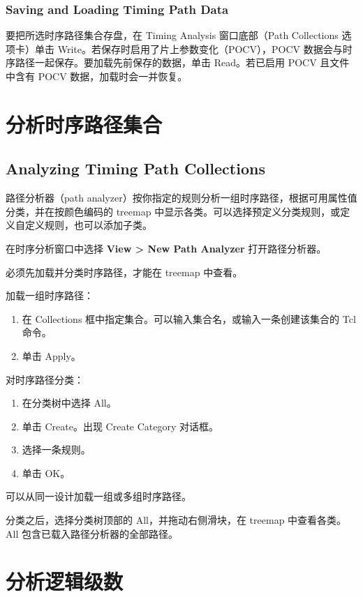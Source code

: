\subsubsection*{Saving and Loading Timing Path Data}

要把所选时序路径集合存盘，在 Timing Analysis 窗口底部（Path Collections 选项卡）单击 Write。若保存时启用了片上参数变化（POCV），POCV 数据会与时序路径一起保存。要加载先前保存的数据，单击 Read。若已启用 POCV 且文件中含有 POCV 数据，加载时会一并恢复。

\section{分析时序路径集合}
\subsection*{Analyzing Timing Path Collections}

路径分析器（path analyzer）按你指定的规则分析一组时序路径，根据可用属性值分类，并在按颜色编码的 treemap 中显示各类。可以选择预定义分类规则，或定义自定义规则，也可以添加子类。

在时序分析窗口中选择 \textbf{View > New Path Analyzer} 打开路径分析器。

必须先加载并分类时序路径，才能在 treemap 中查看。

加载一组时序路径：
\begin{enumerate}
  \item 在 Collections 框中指定集合。可以输入集合名，或输入一条创建该集合的 Tcl 命令。
  \item 单击 Apply。
\end{enumerate}

对时序路径分类：
\begin{enumerate}
  \item 在分类树中选择 All。
  \item 单击 Create。出现 Create Category 对话框。
  \item 选择一条规则。
  \item 单击 OK。
\end{enumerate}

可以从同一设计加载一组或多组时序路径。

分类之后，选择分类树顶部的 All，并拖动右侧滑块，在 treemap 中查看各类。All 包含已载入路径分析器的全部路径。

\section{分析逻辑级数}
